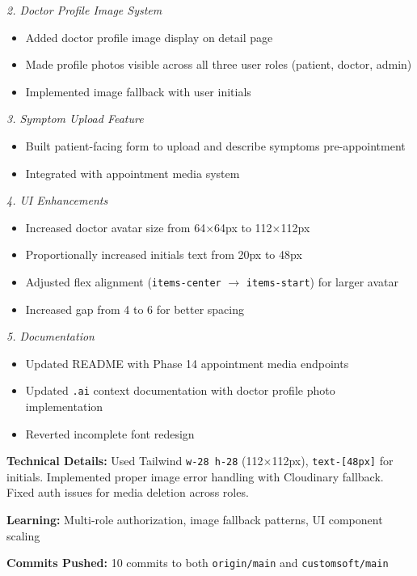 \documentclass[11pt,a4paper]{article}
\begin{document}
\textit{2. Doctor Profile Image System}
\begin{itemize}
  \item Added doctor profile image display on detail page
  \item Made profile photos visible across all three user roles (patient, doctor, admin)
  \item Implemented image fallback with user initials
\end{itemize}

\textit{3. Symptom Upload Feature}
\begin{itemize}
  \item Built patient-facing form to upload and describe symptoms pre-appointment
  \item Integrated with appointment media system
\end{itemize}

\textit{4. UI Enhancements}
\begin{itemize}
  \item Increased doctor avatar size from 64$\times$64px to 112$\times$112px
  \item Proportionally increased initials text from 20px to 48px
  \item Adjusted flex alignment (\texttt{items-center} $\rightarrow$ \texttt{items-start})
        for larger avatar
  \item Increased gap from 4 to 6 for better spacing
\end{itemize}

\textit{5. Documentation}
\begin{itemize}
  \item Updated README with Phase 14 appointment media endpoints
  \item Updated \texttt{.ai} context documentation with doctor profile photo implementation
  \item Reverted incomplete font redesign
\end{itemize}

\textbf{Technical Details:} Used Tailwind \texttt{w-28 h-28} (112$\times$112px),
\texttt{text-[48px]} for initials. Implemented proper image error handling with Cloudinary
fallback. Fixed auth issues for media deletion across roles.

\textbf{Learning:} Multi-role authorization, image fallback patterns, UI component scaling

\textbf{Commits Pushed:} 10 commits to both \texttt{origin/main} and \texttt{customsoft/main}

\newpage
\end{document}
